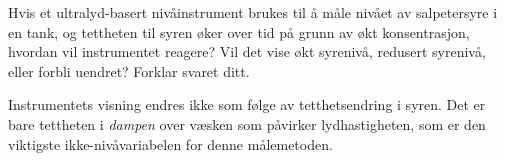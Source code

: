 

Hvis et ultralyd-basert nivåinstrument brukes til å måle nivået av salpetersyre i en tank, og tettheten til syren øker over tid på grunn av økt konsentrasjon, hvordan vil instrumentet reagere? Vil det vise økt syrenivå, redusert syrenivå, eller forbli uendret? Forklar svaret ditt.







Instrumentets visning endres ikke som følge av tetthetsendring i syren. Det er bare tettheten i {\it dampen} over væsken som påvirker lydhastigheten, som er den viktigste ikke-nivåvariabelen for denne målemetoden.









